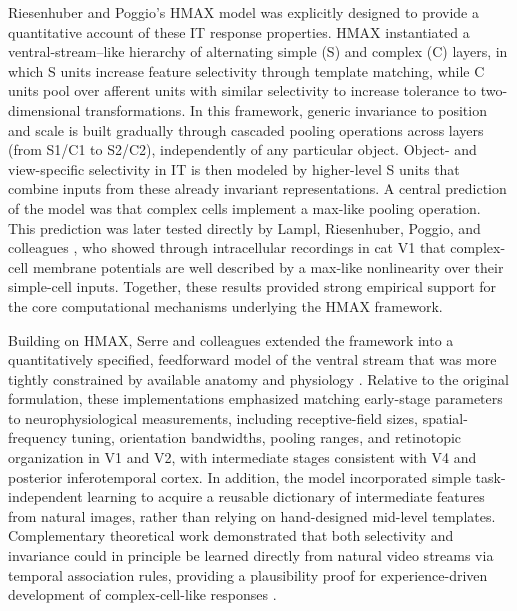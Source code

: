\documentclass[11pt,a4paper]{article}
\begin{document}
Riesenhuber and Poggio’s HMAX model \citep{RiesenhuberPoggio1999} was explicitly designed to provide a quantitative account of these IT response properties. HMAX instantiated a ventral-stream--like hierarchy of alternating simple (S) and complex (C) layers, in which S units increase feature selectivity through template matching, while C units pool over afferent units with similar selectivity to increase tolerance to two-dimensional transformations. In this framework, generic invariance to position and scale is built gradually through cascaded pooling operations across layers (from S1/C1 to S2/C2), independently of any particular object. Object- and view-specific selectivity in IT is then modeled by higher-level S units that combine inputs from these already invariant representations. A central prediction of the model was that complex cells implement a max-like pooling operation. This prediction was later tested directly by Lampl, Riesenhuber, Poggio, and colleagues \citep{Lampl2004}, who showed through intracellular recordings in cat V1 that complex-cell membrane potentials are well described by a max-like nonlinearity over their simple-cell inputs. Together, these results provided strong empirical support for the core computational mechanisms underlying the HMAX framework.

Building on HMAX, Serre and colleagues extended the framework into a quantitatively specified, feedforward model of the ventral stream that was more tightly constrained by available anatomy and physiology \citep{Serre2007}. Relative to the original formulation, these implementations emphasized matching early-stage parameters to neurophysiological measurements, including receptive-field sizes, spatial-frequency tuning, orientation bandwidths, pooling ranges, and retinotopic organization in V1 and V2, with intermediate stages consistent with V4 and posterior inferotemporal cortex. In addition, the model incorporated simple task-independent learning to acquire a reusable dictionary of intermediate features from natural images, rather than relying on hand-designed mid-level templates. Complementary theoretical work demonstrated that both selectivity and invariance could in principle be learned directly from natural video streams via temporal association rules, providing a plausibility proof for experience-driven development of complex-cell-like responses \citep{Masquelier2007tr}.
\end{document}
